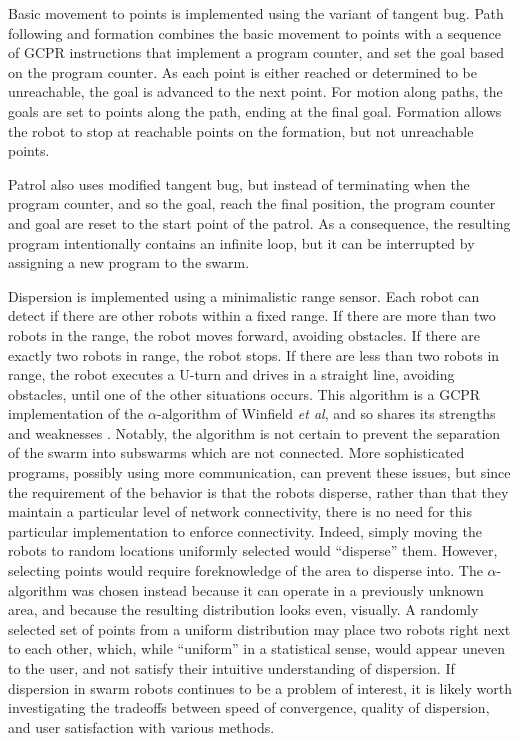 Basic movement to points is implemented using the variant of tangent bug. 
Path following and formation combines the basic movement to points with a sequence of GCPR instructions that implement a program counter, and set the goal based on the program counter. 
As each point is either reached or determined to be unreachable, the goal is advanced to the next point.
For motion along paths, the goals are set to points along the path, ending at the final goal. 
Formation allows the robot to stop at reachable points on the formation, but not unreachable points.  

Patrol also uses modified tangent bug, but instead of terminating when the program counter, and so the goal, reach the final position, the program counter and goal are reset to the start point of the patrol.  
As a consequence, the resulting program intentionally contains an infinite loop, but it can be interrupted by assigning a new program to the swarm. 

Dispersion is implemented using a minimalistic range sensor. 
Each robot can detect if there are other robots within a fixed range. 
If there are more than two robots in the range, the robot moves forward, avoiding obstacles. 
If there are exactly two robots in range, the robot stops. If there are less than two robots in range, the robot executes a U-turn and drives in a straight line, avoiding obstacles, until one of the other situations occurs. 
This algorithm is a GCPR implementation of the $\alpha$-algorithm of Winfield \emph{et al}, and so shares its strengths and weaknesses  \citep{winfield2008modelling}.
Notably, the algorithm is not certain to prevent the separation of the swarm into subswarms which are not connected. 
More sophisticated programs, possibly using more communication, can prevent these issues, but since the requirement of the behavior is that the robots disperse, rather than that they maintain a particular level of network connectivity, there is no need for this particular implementation to enforce connectivity. 
Indeed, simply moving the robots to random locations uniformly selected would ``disperse'' them. 
However, selecting points would require foreknowledge of the area to disperse into. 
The $\alpha$-algorithm was chosen instead because it can operate in a previously unknown area, and because the resulting distribution looks even, visually. 
A randomly selected set of points from a uniform distribution may place two robots right next to each other, which, while ``uniform'' in a statistical sense, would appear uneven to the user, and not satisfy their intuitive understanding of dispersion. 
If dispersion in swarm robots continues to be a problem of interest, it is likely worth investigating the tradeoffs between speed of convergence, quality of dispersion, and user satisfaction with various methods. 

